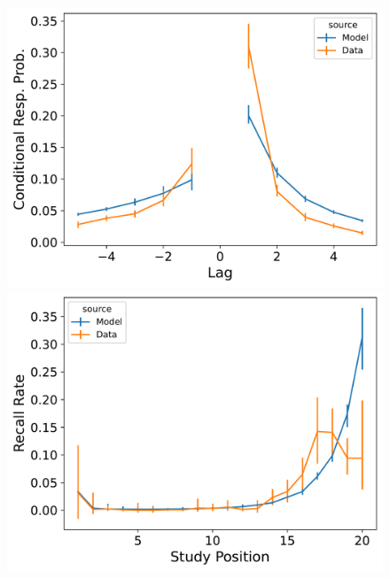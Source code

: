 \documentclass[
  letterpaper,
  11pt,
  english,
  singlespacing,
  headsepline]{MastersDoctoralThesis}
\begin{document}
\begin{figure}

\begin{minipage}{0.33\linewidth}
\includegraphics{icmr_figures/Murdock1962_ConnectionistCMR_Model_Fitting_LL20_crp-1.png}\end{minipage}%
%
\begin{minipage}{0.33\linewidth}
\includegraphics{icmr_figures/Murdock1962_ConnectionistCMR_Model_Fitting_LL20_pnr-1.png}\end{minipage}%
%
\begin{minipage}{0.33\linewidth}

\end{minipage}
\end{figure}
\end{document}
